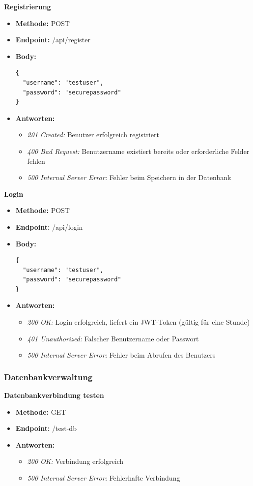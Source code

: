 \textbf{Registrierung}
\begin{itemize}
    \item \textbf{Methode: }POST 
    \item \textbf{Endpoint: }/api/register 
    \item \textbf{Body: } \begin{verbatim}
{
  "username": "testuser",
  "password": "securepassword"
}
    \end{verbatim}
    \item \textbf{Antworten: }
    \begin{itemize}
        \item \textit{201 Created: }Benutzer erfolgreich registriert
        \item \textit{400 Bad Request: }Benutzername existiert bereits oder erforderliche Felder fehlen
        \item \textit{500 Internal Server Error: }Fehler beim Speichern in der Datenbank
    \end{itemize}
\end{itemize}
\textbf{Login}
\begin{itemize}
    \item \textbf{Methode: }POST 
    \item \textbf{Endpoint: }/api/login  
    \item \textbf{Body: } \begin{verbatim}
{
  "username": "testuser",
  "password": "securepassword"
}
    \end{verbatim}
    \item \textbf{Antworten: }
    \begin{itemize}
        \item \textit{200 OK: }Login erfolgreich, liefert ein JWT-Token (gültig für eine Stunde)
        \item \textit{401 Unauthorized: }Falscher Benutzername oder Passwort
        \item \textit{500 Internal Server Error: }Fehler beim Abrufen des Benutzers
    \end{itemize}
\end{itemize}


\subsubsection{Datenbankverwaltung}

\textbf{Datenbankverbindung testen}
\begin{itemize}
    \item \textbf{Methode: }GET 
    \item \textbf{Endpoint: }/test-db
    \item \textbf{Antworten: }
    \begin{itemize}
        \item \textit{200 OK: }Verbindung erfolgreich
        \item \textit{500 Internal Server Error: }Fehlerhafte Verbindung
    \end{itemize}
\end{itemize}


